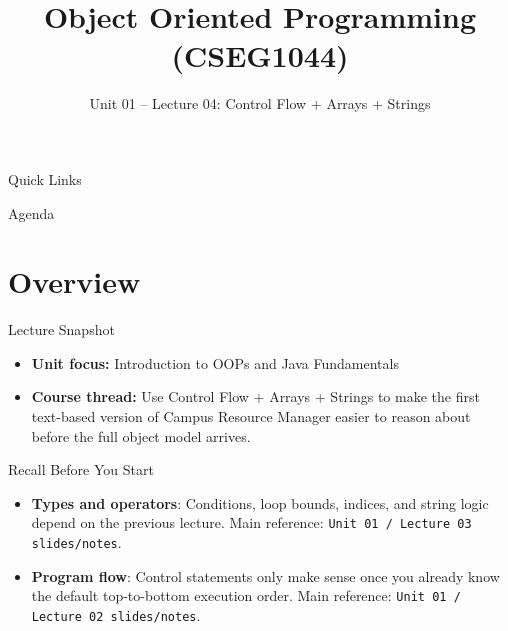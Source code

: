 \documentclass{beamer}
\title[OOPS with Java]{Object Oriented Programming (CSEG1044)}
\subtitle{Unit 01 -- Lecture 04: Control Flow + Arrays + Strings}
\begin{document}
\begin{frame}[fragile]
  \titlepage
  \vspace{0.5em}
  \slidesources{\OOPSUnitISources}
\end{frame}

\begin{frame}{Quick Links}
  \centering
  \hyperlink{sec:overview}{}\hspace{0.6em}
  \hyperlink{sec:concepts}{}\hspace{0.6em}
  \hyperlink{sec:demo}{}\hspace{0.6em}
  \hyperlink{sec:summary}{}
  \slidesources{\OOPSUnitISources}
\end{frame}

\begin{frame}{Agenda}
  \tableofcontents
  \slidesources{\OOPSUnitISources}
\end{frame}

\section{Overview}
\label{sec:overview}

\begin{frame}{Lecture Snapshot}
\begin{itemize}[<+->]
  \item \textbf{Unit focus:} Introduction to OOPs and Java Fundamentals
  \item \textbf{Course thread:} Use Control Flow + Arrays + Strings to make the first text-based version of Campus Resource Manager easier to reason about before the full object model arrives.
\end{itemize}
  \slidesources{\OOPSUnitISources}
\end{frame}

\begin{frame}{Recall Before You Start}
\begin{itemize}[<+->]
  \item \textbf{Types and operators}: Conditions, loop bounds, indices, and string logic depend on the previous lecture. Main reference: \texttt{Unit 01 / Lecture 03 slides/notes}.
  \item \textbf{Program flow}: Control statements only make sense once you already know the default top-to-bottom execution order. Main reference: \texttt{Unit 01 / Lecture 02 slides/notes}.
\end{itemize}
  \slidesources{\OOPSUnitISources}
\end{frame}
\end{document}
